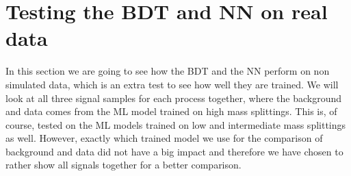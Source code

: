 \section{Testing the BDT and NN on real data}

In this section we are going to see how the BDT and the NN perform on non simulated data, which is an extra test to see how well they are trained. We will look at all three signal samples for each process together, where the background and data comes from the ML model trained on high mass splittings. This is, of course, tested on the ML models trained on low and intermediate mass splittings as well. However, exactly which trained model we use for the comparison of background and data did not have a big impact and therefore we have chosen to rather show all signals together for a better comparison. 

